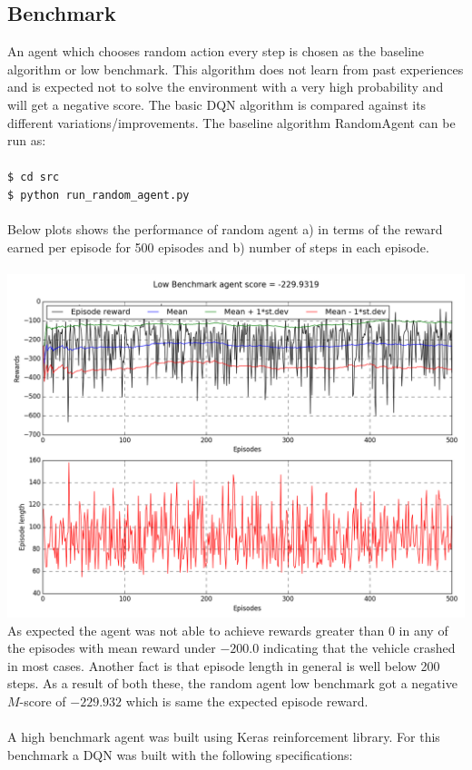 \documentclass{article}
\begin{document}
\subsection*{Benchmark}
An agent which chooses random action every step is chosen as the baseline algorithm or low benchmark. This algorithm does not learn from past experiences and is expected not to solve the environment with a very high probability and will get a negative score. The basic DQN algorithm is compared against its different variations/improvements.
The baseline algorithm RandomAgent can be run as:\\
\texttt{\\\$ cd src}
\texttt{\\\$ python run\_random\_agent.py}\\\\
Below plots shows the performance of random agent a) in terms of the reward earned per episode for 500 episodes and b) number of steps in each episode.\\\\
\includegraphics[width=15cm,trim={0 0 0 0},clip]{img/randomagent}\\
As expected the agent was not able to achieve rewards greater than $0$ in any of the episodes with mean reward under $-200.0$ indicating that the vehicle crashed in most cases. Another fact is that episode length in general is well below 200 steps. As a result of both these, the random agent low benchmark got a negative $M$-score of $-229.932$ which is same the expected episode reward.\\\\
A high benchmark agent was built using Keras reinforcement library\cite{kerasrl}. For this benchmark a DQN was built with the following specifications:
\end{document}
